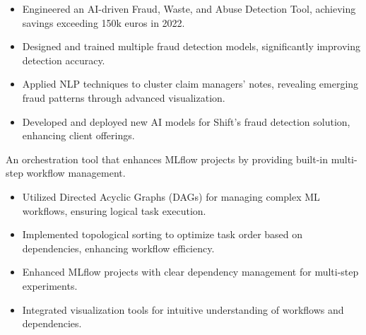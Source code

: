 \documentclass[10pt,letter,ragged2e,withhyper]{altacv}
\renewcommand{\divider}{\textcolor{body!30}{\hdashrule{\linewidth}{0.6pt}{0.5ex}}\medskip}
\begin{document}
\begin{paracol}{2}
\divider
{}

\begin{itemize}
  \item Engineered an AI-driven Fraud, Waste, and Abuse Detection Tool, achieving savings exceeding 150k euros in 2022.
  \item Designed and trained multiple fraud detection models, significantly improving detection accuracy.
\end{itemize}

\divider
{}

\begin{itemize}
  \item Applied NLP techniques to cluster claim managers' notes, revealing emerging fraud patterns through advanced visualization.
  \item Developed and deployed new AI models for Shift's fraud detection solution, enhancing client offerings.
\end{itemize}





An orchestration tool that enhances MLflow projects by providing built-in multi-step workflow management.

\begin{itemize}
      \item Utilized Directed Acyclic Graphs (DAGs) for managing complex ML workflows, ensuring logical task execution.
      \item Implemented topological sorting to optimize task order based on dependencies, enhancing workflow efficiency.
      \item Enhanced MLflow projects with clear dependency management for multi-step experiments.
      \item Integrated visualization tools for intuitive understanding of workflows and dependencies.
  \end{itemize}

\divider
{}


\end{paracol}
\end{document}
